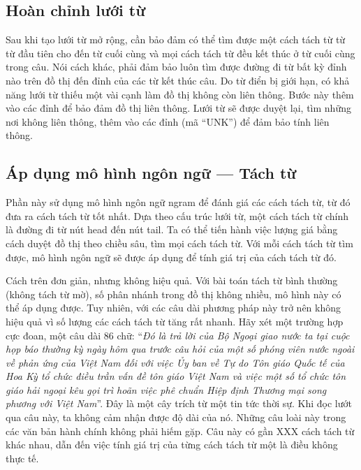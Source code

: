 \documentclass[a4paper,oneside,14pt]{extbook} %
\begin{document}
\subsection{Hoàn chỉnh lưới từ}
\label{sec:lattice:competion}

Sau khi tạo lưới từ mở rộng, cần bảo đảm có thể tìm được một cách tách
từ từ từ đầu tiên cho đến từ cuối cùng và mọi cách tách từ đều kết thúc
ở từ cuối cùng trong câu. Nói cách khác, phải đảm bảo luôn tìm được
đường đi từ bất kỳ đỉnh nào trên đồ thị đến đỉnh của các từ kết thúc câu.
Do từ điển bị giới hạn, có khả năng lưới từ thiếu một vài cạnh làm đồ
thị không còn liên thông. Bước này thêm vào các đỉnh để bảo đảm đồ thị
liên thông. Lưới từ sẽ được duyệt lại, tìm những nơi không liên thông,
thêm vào các đỉnh (mã ``UNK'') để đảm bảo tính liên thông. 

\subsection{Áp dụng mô hình ngôn ngữ --- Tách từ}

\label{sec:language-model}

Phần này sử dụng mô hình ngôn ngữ ngram để đánh giá các cách tách từ,
từ đó đưa ra cách tách từ tốt nhất. Dựa theo cấu trúc lưới từ, một
cách tách từ chính là đường đi từ nút head đến nút tail. Ta có thể
tiến hành việc lượng giá bằng cách duyệt đồ thị theo chiều sâu, tìm
mọi cách tách từ. Với mỗi cách tách từ tìm được, mô hình ngôn ngữ sẽ
được áp dụng để tính giá trị của cách tách từ đó.

Cách trên đơn giản, nhưng không hiệu quả. Với bài toán tách từ bình
thường (không tách từ mờ), số phân nhánh trong đồ thị không nhiều, mô
hình này có thể áp dụng được. Tuy nhiên, với các câu dài phương pháp
này trở nên không hiệu quả vì số lượng các cách tách từ tăng rất
nhanh. Hãy xét một trường hợp cực đoan, một câu dài 86 chữ: ``\textit{Đó là trả
lời của Bộ Ngoại giao nước ta tại cuộc họp báo thường kỳ ngày hôm qua trước
câu hỏi của một số phóng viên nước ngoài về phản ứng của Việt Nam đối
với việc Ủy ban về Tự do Tôn giáo Quốc tế của Hoa Kỳ tổ chức điều trần
vấn đề tôn giáo Việt Nam và việc một số tổ chức tôn giáo hải ngoại kêu
gọi trì hoãn việc phê chuẩn Hiệp định Thương mại song phương với Việt
Nam}''. Đây là một cây trích từ một tin tức thời sự. Khi đọc lướt qua câu
này, ta không cảm nhận được độ dài của nó. Những câu loài này trong
các văn bản hành chính không phải hiếm gặp. Câu này có gần XXX cách
tách từ khác nhau, dẫn đến việc tính giá trị của từng cách tách từ một
là điều không thực tế.
\end{document}
